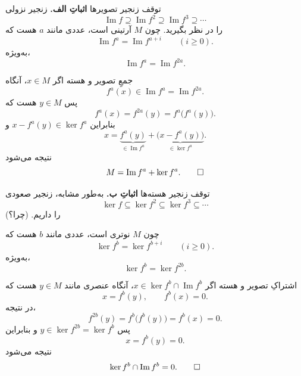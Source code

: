 \begin{frame}[t]{توقف زنجیر تصویرها}
  \label{lec13:image-stabilization}
  \textbf{اثباتِ الف.} زنجیر نزولی
  \[
    \operatorname{Im}f\supseteq\operatorname{Im}f^2
      \supseteq\operatorname{Im}f^3\supseteq\cdots
  \]
  را در نظر بگیرید.
  چون $M$ آرتینی است، عددی مانند $a$ هست که
  \[
    \operatorname{Im}f^a=\operatorname{Im}f^{a+i}
    \qquad(i\geqslant0).
  \]
  به‌ویژه،
  \[
    \operatorname{Im}f^a=\operatorname{Im}f^{2a}.
  \]
\end{frame}

\begin{frame}[t]{جمعِ تصویر و هسته}
  \label{lec13:image-kernel-sum}
  اگر $x\in M$، آنگاه
  \[
    f^a(x)\in\operatorname{Im}f^a=\operatorname{Im}f^{2a}.
  \]
  پس $y\in M$ هست که
  \[
    f^a(x)=f^{2a}(y)=f^a\bigl(f^a(y)\bigr).
  \]
  بنابراین $x-f^a(y)\in\ker f^a$ و
  \[
    x=\underbrace{f^a(y)}_{\in\operatorname{Im}f^a}
      +\underbrace{\bigl(x-f^a(y)\bigr)}_{\in\ker f^a}.
  \]
  نتیجه می‌شود
  \[
    M=\operatorname{Im}f^a+\ker f^a.\qed
  \]
\end{frame}

\begin{frame}[t]{توقف زنجیر هسته‌ها}
  \label{lec13:kernel-stabilization}
  \textbf{اثباتِ ب.} به‌طور مشابه، زنجیر صعودی
  \[
    \ker f\subseteq\ker f^2\subseteq\ker f^3\subseteq\cdots
  \]
  را داریم. \hfill(چرا؟)
  \par\medskip
  چون $M$ نوتری است، عددی مانند $b$ هست که
  \[
    \ker f^b=\ker f^{b+i}\qquad(i\geqslant0).
  \]
  به‌ویژه،
  \[
    \ker f^b=\ker f^{2b}.
  \]
\end{frame}

\begin{frame}[t]{اشتراکِ تصویر و هسته}
  \label{lec13:image-kernel-intersection}
  اگر $x\in\ker f^b\cap\operatorname{Im}f^b$، آنگاه عنصری مانند $y\in M$ هست که
  \[
    x=f^b(y),\qquad f^b(x)=0.
  \]
  در نتیجه،
  \[
    f^{2b}(y)=f^b\bigl(f^b(y)\bigr)=f^b(x)=0.
  \]
  پس $y\in\ker f^{2b}=\ker f^b$ و بنابراین
  \[
    x=f^b(y)=0.
  \]
  نتیجه می‌شود
  \[
    \ker f^b\cap\operatorname{Im}f^b=0.\qed
  \]
\end{frame}

